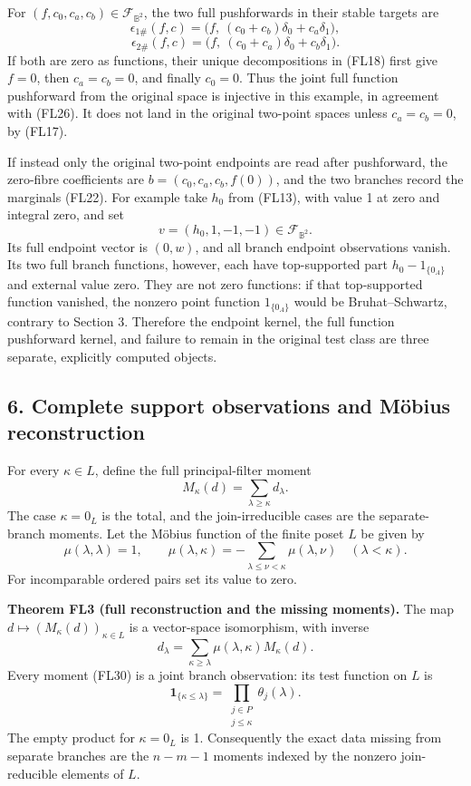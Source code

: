 \documentclass[
  10pt,
]{article}
\begin{document}
For \((f,c_0,c_a,c_b)\in\mathcal F_{\mathbb B^2}\), the two full
pushforwards in their stable targets are \[
\epsilon_{1\#}(f,c)
=\bigl(f,\ (c_0+c_b)\delta_0+c_a\delta_1\bigr),
\] \[
\epsilon_{2\#}(f,c)
=\bigl(f,\ (c_0+c_a)\delta_0+c_b\delta_1\bigr).
\tag{FL28}
\] If both are zero as functions, their unique decompositions in (FL18)
first give \(f=0\), then \(c_a=c_b=0\), and finally \(c_0=0\). Thus the
joint full function pushforward from the original space is injective in
this example, in agreement with (FL26). It does not land in the original
two-point spaces unless \(c_a=c_b=0\), by (FL17).

If instead only the original two-point endpoints are read after
pushforward, the zero-fibre coefficients are \(b=(c_0,c_a,c_b,f(0))\),
and the two branches record the marginals (FL22). For example take
\(h_0\) from (FL13), with value 1 at zero and integral zero, and set \[
v=(h_0,1,-1,-1)\in\mathcal F_{\mathbb B^2}.
\tag{FL29}
\] Its full endpoint vector is \((0,w)\), and all branch endpoint
observations vanish. Its two full branch functions, however, each have
top-supported part \(h_0-1_{\{0_A\}}\) and external value zero. They are
not zero functions: if that top-supported function vanished, the nonzero
point function \(1_{\{0_A\}}\) would be Bruhat--Schwartz, contrary to
Section 3. Therefore the endpoint kernel, the full function pushforward
kernel, and failure to remain in the original test class are three
separate, explicitly computed objects.

\subsection{6. Complete support observations and Möbius
reconstruction}\label{complete-support-observations-and-muxf6bius-reconstruction}

For every \(\kappa\in L\), define the full principal-filter moment \[
M_\kappa(d)=\sum_{\lambda\ge\kappa}d_\lambda.
\tag{FL30}
\] The case \(\kappa=0_L\) is the total, and the join-irreducible cases
are the separate-branch moments. Let the Möbius function of the finite
poset \(L\) be given by \[
\mu(\lambda,\lambda)=1,\qquad
\mu(\lambda,\kappa)=-\sum_{\lambda\le\nu<\kappa}\mu(\lambda,\nu)
\quad(\lambda<\kappa).
\tag{FL31}
\] For incomparable ordered pairs set its value to zero.

\textbf{Theorem FL3 (full reconstruction and the missing moments).} The
map \(d\mapsto(M_\kappa(d))_{\kappa\in L}\) is a vector-space
isomorphism, with inverse \[
d_\lambda=\sum_{\kappa\ge\lambda}\mu(\lambda,\kappa)M_\kappa(d).
\tag{FL32}
\] Every moment (FL30) is a joint branch observation: its test function
on \(L\) is \[
\mathbf1_{\{\kappa\le\lambda\}}
=\prod_{\substack{j\in P\\j\le\kappa}}\theta_j(\lambda).
\tag{FL33}
\] The empty product for \(\kappa=0_L\) is 1. Consequently the exact
data missing from separate branches are the \(n-m-1\) moments indexed by
the nonzero join-reducible elements of \(L\).
\end{document}
